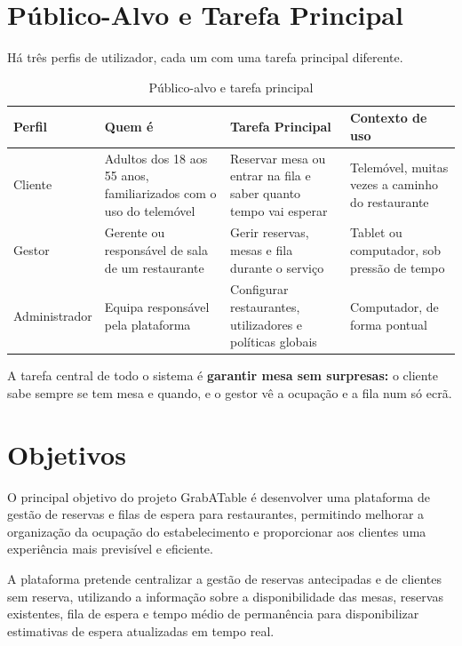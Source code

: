 \section{Público-Alvo e Tarefa Principal}

Há três perfis de utilizador, cada um com uma tarefa principal diferente.

\begin{table}[H]
    \centering
    \renewcommand{\arraystretch}{1.3}
    \begin{tabularx}{\textwidth}{@{}l X X X@{}}
        \toprule
        \textbf{Perfil} & \textbf{Quem é} & \textbf{Tarefa Principal} & \textbf{Contexto de uso} \\
        \midrule

        Cliente &
        Adultos dos 18 aos 55 anos, familiarizados com o uso do telemóvel &
        Reservar mesa ou entrar na fila e saber quanto tempo vai esperar &
        Telemóvel, muitas vezes a caminho do restaurante \\
        \midrule

        Gestor &
        Gerente ou responsável de sala de um restaurante &
        Gerir reservas, mesas e fila durante o serviço &
        Tablet ou computador, sob pressão de tempo \\
        \midrule

        Administrador &
        Equipa responsável pela plataforma &
        Configurar restaurantes, utilizadores e políticas globais &
        Computador, de forma pontual \\

        \bottomrule
    \end{tabularx}
    \caption{Público-alvo e tarefa principal}
    \label{tab:publico-alvo}
\end{table}

A tarefa central de todo o sistema é \textbf{garantir mesa sem surpresas:} o cliente sabe sempre se tem mesa e quando, e o gestor vê a ocupação e a fila num só ecrã.

\section{Objetivos}
O principal objetivo do projeto GrabATable é desenvolver uma plataforma de gestão de reservas e filas de espera para restaurantes, permitindo melhorar a organização da ocupação do estabelecimento e proporcionar aos clientes uma experiência mais previsível e eficiente.

A plataforma pretende centralizar a gestão de reservas antecipadas e de clientes sem reserva, utilizando a informação sobre a disponibilidade das mesas, reservas existentes, fila de espera e tempo médio de permanência para disponibilizar estimativas de espera atualizadas em tempo real.

